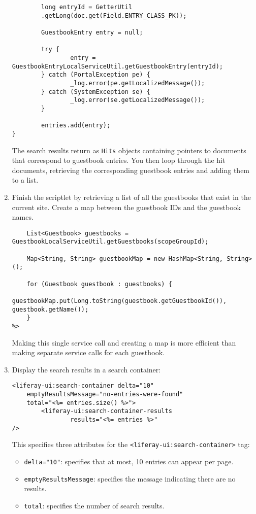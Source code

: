 \begin{enumerate}
\begin{verbatim}
        long entryId = GetterUtil
        .getLong(doc.get(Field.ENTRY_CLASS_PK));

        GuestbookEntry entry = null;

        try {
                entry = GuestbookEntryLocalServiceUtil.getGuestbookEntry(entryId);
        } catch (PortalException pe) {
                _log.error(pe.getLocalizedMessage());
        } catch (SystemException se) {
                _log.error(se.getLocalizedMessage());
        }

        entries.add(entry);
}
\end{verbatim}

  The search results return as \texttt{Hits} objects containing pointers
  to documents that correspond to guestbook entries. You then loop
  through the hit documents, retrieving the corresponding guestbook
  entries and adding them to a list.
\item
  Finish the scriptlet by retrieving a list of all the guestbooks that
  exist in the current site. Create a map between the guestbook IDs and
  the guestbook names.

\begin{verbatim}
    List<Guestbook> guestbooks = GuestbookLocalServiceUtil.getGuestbooks(scopeGroupId);

    Map<String, String> guestbookMap = new HashMap<String, String>();

    for (Guestbook guestbook : guestbooks) {
            guestbookMap.put(Long.toString(guestbook.getGuestbookId()), guestbook.getName());
    }
%>
\end{verbatim}

  Making this single service call and creating a map is more efficient
  than making separate service calls for each guestbook.
\item
  Display the search results in a search container:

\begin{verbatim}
<liferay-ui:search-container delta="10" 
    emptyResultsMessage="no-entries-were-found" 
    total="<%= entries.size() %>">
        <liferay-ui:search-container-results
                results="<%= entries %>"
/>
\end{verbatim}

  This specifies three attributes for the
  \texttt{\textless{}liferay-ui:search-container\textgreater{}} tag:

  \begin{itemize}
  \tightlist
  \item
    \texttt{delta="10"}: specifies that at most, 10 entries can appear
    per page.
  \item
    \texttt{emptyResultsMessage}: specifies the message indicating there
    are no results.
  \item
    \texttt{total}: specifies the number of search results.
  \end{itemize}


\end{enumerate}
